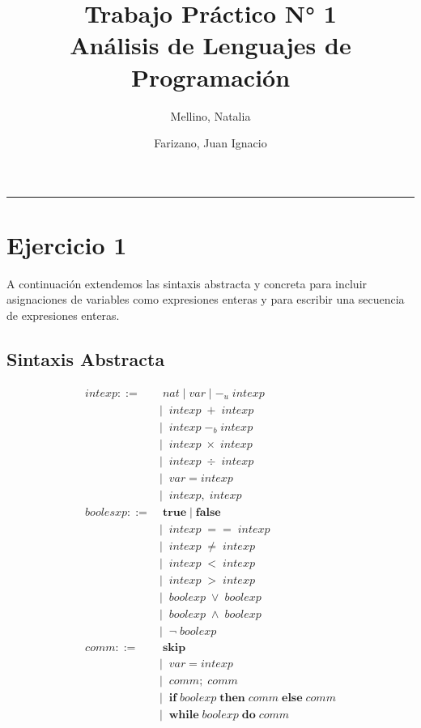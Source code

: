 \documentclass[11pt, fleqn]{article}
\title{%
    Trabajo Práctico N° 1 \\
    \large Análisis de Lenguajes de Programación}
\author{Mellino, Natalia \and Farizano, Juan Ignacio}
\date{}
\begin{document}
\maketitle
\noindent\rule{\textwidth}{1pt}


\section*{Ejercicio 1}
A continuación extendemos las sintaxis abstracta y concreta para incluir asignaciones
de variables como expresiones enteras y para escribir una secuencia de expresiones enteras.

\subsection*{Sintaxis Abstracta}
\begin{align*}
intexp ::=& \; nat \; | \; var \; | \; -_u \; intexp \\
          &| \;\; intexp \; +  \; intexp \\
          &| \;\; intexp \; -_b  \; intexp \\
          &| \;\; intexp \; \times  \; intexp \\
          &| \;\; intexp \; \div  \; intexp \\
          &| \;\; var = intexp \\
          &| \;\; intexp, \; intexp \\
boolesxp ::=& \; \textbf{true} \; | \; \textbf{false} \\
            &| \;\; intexp \; ==  \; intexp \\
            &| \;\; intexp \; \neq  \; intexp \\
            &| \;\; intexp \; <  \; intexp \\
            &| \;\; intexp \; >  \; intexp \\
            &| \;\; boolexp \; \lor  \; boolexp \\
            &| \;\; boolexp \; \land  \; boolexp \\
            &| \;\; \neg \; boolexp \\
comm ::=& \; \textbf{skip} \\
        &| \;\; var = intexp \\
        &| \;\; comm; \; comm \\
        &| \;\; \textbf{if} \; boolexp \; \textbf{then} \; comm \; \textbf{else} \; comm \\
        &| \; \; \textbf{while} \; boolexp \; \textbf{do} \; comm
\end{align*}
\end{document}
